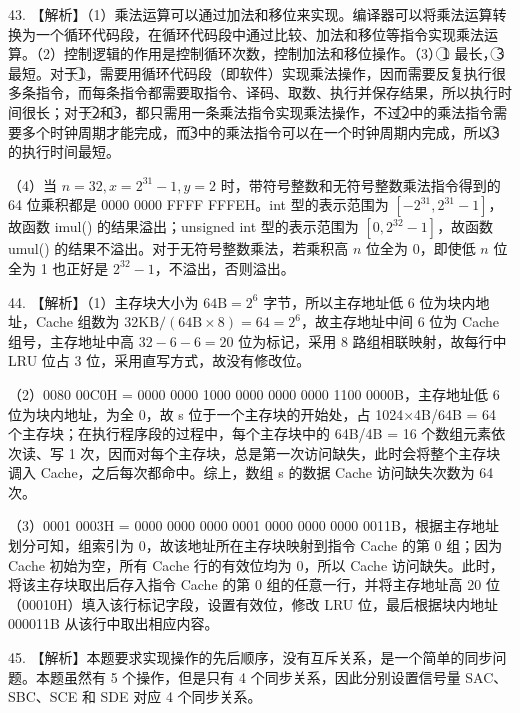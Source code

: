 \documentclass[UTF8,11pt]{ctexart}
\begin{document}
43. 【解析】（1）乘法运算可以通过加法和移位来实现。编译器可以将乘法运算转换为一个循环代码段，在循环代码段中通过比较、加法和移位等指令实现乘法运算。（2）控制逻辑的作用是控制循环次数，控制加法和移位操作。（3）\textcircled{1} 最长，\textcircled{3} 最短。对于\textcircled{1}，需要用循环代码段（即软件）实现乘法操作，因而需要反复执行很多条指令，而每条指令都需要取指令、译码、取数、执行并保存结果，所以执行时间很长；对于\textcircled{2}和\textcircled{3}，都只需用一条乘法指令实现乘法操作，不过\textcircled{2}中的乘法指令需要多个时钟周期才能完成，而\textcircled{3}中的乘法指令可以在一个时钟周期内完成，所以\textcircled{3}的执行时间最短。


（4）当 \(\displaystyle n=32,\allowbreak x=2^{31}-1,\allowbreak y=2\) 时，带符号整数和无符号整数乘法指令得到的 64 位乘积都是 0000 0000 FFFF FFFEH。int 型的表示范围为 \(\displaystyle [-2^{31},\allowbreak 2^{31}-1]\)，故函数 imul() 的结果溢出；unsigned int 型的表示范围为 \(\displaystyle [0,\allowbreak 2^{32}-1]\)，故函数 umul() 的结果不溢出。对于无符号整数乘法，若乘积高 \(\displaystyle n\) 位全为 0，即使低 \(\displaystyle n\) 位全为 1 也正好是 \(\displaystyle 2^{32}-1\)，不溢出，否则溢出。


44. 【解析】（1）主存块大小为 \(\displaystyle 64\mathrm{B}=2^6\) 字节，所以主存地址低 6 位为块内地址，Cache 组数为 \(\displaystyle 32\mathrm{KB}/(64\mathrm{B}\times8)=64=2^6\)，故主存地址中间 6 位为 Cache 组号，主存地址中高 \(\displaystyle 32-6-6=20\) 位为标记，采用 8 路组相联映射，故每行中 LRU 位占 3 位，采用直写方式，故没有修改位。


（2）0080 00C0H = 0000 0000 1000 0000 0000 0000 1100 0000B，主存地址低 6 位为块内地址，为全 0，故 s 位于一个主存块的开始处，占 1024\(\displaystyle \times\)4B/64B = 64 个主存块；在执行程序段的过程中，每个主存块中的 64B/4B = 16 个数组元素依次读、写 1 次，因而对每个主存块，总是第一次访问缺失，此时会将整个主存块调入 Cache，之后每次都命中。综上，数组 s 的数据 Cache 访问缺失次数为 64 次。


（3）0001 0003H = 0000 0000 0000 0001 0000 0000 0000 0011B，根据主存地址划分可知，组索引为 0，故该地址所在主存块映射到指令 Cache 的第 0 组；因为 Cache 初始为空，所有 Cache 行的有效位均为 0，所以 Cache 访问缺失。此时，将该主存块取出后存入指令 Cache 的第 0 组的任意一行，并将主存地址高 20 位（00010H）填入该行标记字段，设置有效位，修改 LRU 位，最后根据块内地址 000011B 从该行中取出相应内容。


45. 【解析】本题要求实现操作的先后顺序，没有互斥关系，是一个简单的同步问题。本题虽然有 5 个操作，但是只有 4 个同步关系，因此分别设置信号量 SAC、SBC、SCE 和 SDE 对应 4 个同步关系。
\end{document}
